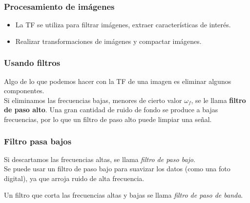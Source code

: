 \begin{frame}
\frametitle{Procesamiento de imágenes}
\begin{itemize}[<+->]
\item La TF se utiliza para filtrar imágenes, extraer características de interés.
\item Realizar transformaciones de imágenes y compactar imágenes.
\end{itemize}
\end{frame}
\begin{frame}
\frametitle{Usando filtros}
Algo de lo que podemos hacer con la TF de una imagen es eliminar algunos componentes.
\\
\bigskip
\pause
Si eliminamos las frecuencias bajas, menores de cierto valor $\omega_{f}$, se le llama \textbf{filtro de paso alto}. \pause Una gran cantidad de ruido de fondo se produce a bajas frecuencias, por lo que un filtro de paso alto puede limpiar una señal.
\end{frame}
\begin{frame}
\frametitle{Filtro pasa bajos}
 Si descartamos las frecuencias altas, se llama \emph{filtro de paso bajo}.
 \\
 \bigskip
 \pause
 Se puede usar un filtro de paso bajo para suavizar los datos (como una foto digital), ya que arroja ruido de alta frecuencia.
 \pause

 Un filtro que corta las frecuencias altas y bajas se llama \emph{filtro de paso de banda}.
\end{frame}
